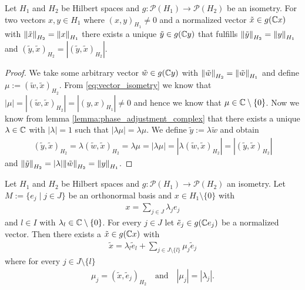 \begin{lemma} \label{lemma:phase_adjustment_ray}
	Let $H_1$ and $H_2$ be Hilbert spaces and $g: \mathcal{P}(H_1) \to \mathcal{P}(H_2)$ be an isometry. For two vectors $x,y \in H_1$ where $(x,y)_{H_1} \neq 0$ and a normalized vector $\tilde{x} \in g(\C x)$ with $\norm[H_2]{\tilde{x}} = \norm[H_1]{x}$ there exists a unique $\tilde{y} \in g(\C y)$ that fulfills $\norm[H_2]{\tilde{y}} = \norm[H_1]{y}$ and $(\tilde{y},\tilde{x})_{H_2} = |(\tilde{y},\tilde{x})_{H_2}| $.
\end{lemma}

\begin{proof}
	We take some arbitrary vector $\tilde{w} \in g(\C y)$ with $\norm[H_2]{\tilde{w}} = \norm[H_1]{\tilde{w}}$ and define $\mu := (\tilde{w}, \tilde{x})_{H_2}$. From \eqref{eq:vector_isometry} we know that $|\mu| = |(\tilde{w},\tilde{x})_{H_2}| = |(y,x)_{H_1}| \neq 0$ and hence we know that $\mu \in \C \setminus \{0\}$. Now we know from lemma \ref{lemma:phase_adjustment_complex} that there exists a unique $\lambda \in \C$ with $|\lambda| = 1$ such that $|\lambda \mu| = \lambda \mu$. We define $\tilde{y} := \lambda \tilde{w}$ and obtain
	\begin{align*}
		(\tilde{y}, \tilde{x})_{H_2} = \lambda (\tilde{w}, \tilde{x})_{H_2} = \lambda \mu = |\lambda \mu| = |\lambda (\tilde{w}, \tilde{x})_{H_2}| = |(\tilde{y},\tilde{x})_{H_2}|
	\end{align*}
	and $\norm[H_2]{\tilde{y}} = |\lambda| \norm[H_2]{\tilde{w}} = \norm[H_1]{y}$. 
\end{proof}


\begin{lemma} \label{lemma:aux_main}
	Let $H_1$ and $H_2$ be Hilbert spaces and $g: \mathcal{P}(H_1) \to \mathcal{P}(H_2)$ an isometry. Let $M := \{e_j \mid j \in J\}$ be an orthonormal basis and $x \in H_1 \setminus \{0\}$ with
	\begin{align*}
		x = \sum_{j \in J} \lambda_j e_j
	\end{align*} 
	and $l \in I$ with $\lambda_l \in \C \setminus \{0\}$. For every $j \in J$ let $\tilde{e}_j \in g(\C e_j)$ be a normalized vector. Then there exists a $\tilde{x} \in g(\C x)$ with 
	\begin{align*}
		\tilde{x} = \lambda_l \tilde{e}_l + \sum_{j \in J \setminus \{l\}} \mu_j \tilde{e}_j
	\end{align*}
	where for every $j \in J \setminus \{l\}$
	\begin{align*}
		\mu_j = (\tilde{x}, \tilde{e}_j)_{H_2} \quad \text{and} \quad |\mu_j| = |\lambda_j|.
	\end{align*}
\end{lemma}

